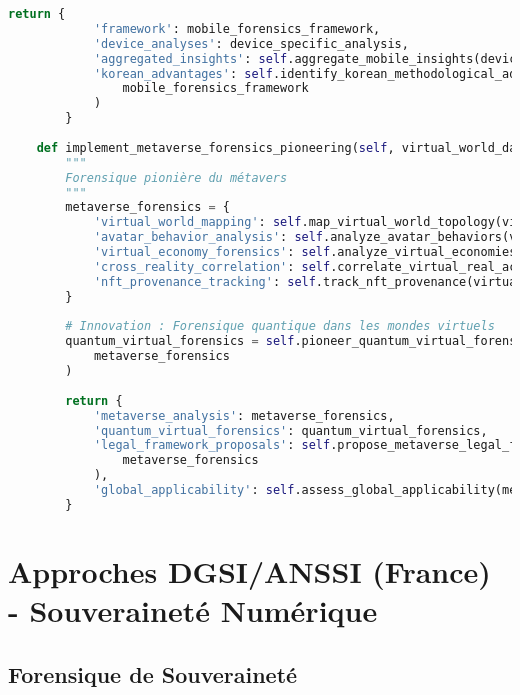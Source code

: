 \begin{lstlisting}[language=Python, caption=Framework coréen d'innovation forensique]
        return {
            'framework': mobile_forensics_framework,
            'device_analyses': device_specific_analysis,
            'aggregated_insights': self.aggregate_mobile_insights(device_specific_analysis),
            'korean_advantages': self.identify_korean_methodological_advantages(
                mobile_forensics_framework
            )
        }
    
    def implement_metaverse_forensics_pioneering(self, virtual_world_data):
        """
        Forensique pionière du métavers
        """
        metaverse_forensics = {
            'virtual_world_mapping': self.map_virtual_world_topology(virtual_world_data),
            'avatar_behavior_analysis': self.analyze_avatar_behaviors(virtual_world_data),
            'virtual_economy_forensics': self.analyze_virtual_economies(virtual_world_data),
            'cross_reality_correlation': self.correlate_virtual_real_activities(virtual_world_data),
            'nft_provenance_tracking': self.track_nft_provenance(virtual_world_data)
        }
        
        # Innovation : Forensique quantique dans les mondes virtuels
        quantum_virtual_forensics = self.pioneer_quantum_virtual_forensics(
            metaverse_forensics
        )
        
        return {
            'metaverse_analysis': metaverse_forensics,
            'quantum_virtual_forensics': quantum_virtual_forensics,
            'legal_framework_proposals': self.propose_metaverse_legal_frameworks(
                metaverse_forensics
            ),
            'global_applicability': self.assess_global_applicability(metaverse_forensics)
        }
\end{lstlisting}

\section{Approches DGSI/ANSSI (France) - Souveraineté Numérique}

\subsection{Forensique de Souveraineté}

